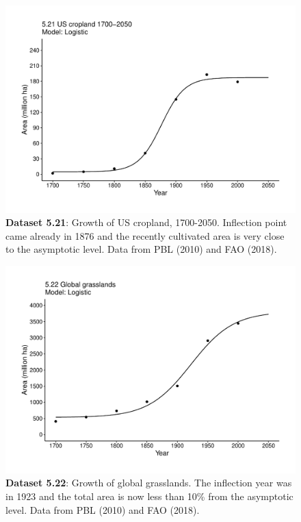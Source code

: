 \documentclass[aps,rmp,preprint,superscriptaddress,10pt,onecolumn]{article}
\begin{document}
\clearpage
\begin{figure}[h]
\includegraphics[width=\textwidth]{output/figs-ggplot/5.21.pdf}
\caption{\textbf{Dataset 5.21}: Growth of US cropland, 1700-2050. Inflection point came already in 1876 and the recently cultivated area is very close to the asymptotic level. Data from PBL (2010) and FAO (2018).}
\end{figure}
	
\clearpage
\begin{figure}[h]
\includegraphics[width=\textwidth]{output/figs-ggplot/5.22.pdf}
\caption{\textbf{Dataset 5.22}: Growth of global grasslands. The inflection year was in 1923 and the total area is now less than 10\% from the asymptotic level. Data from PBL (2010) and FAO (2018).}
\end{figure}
	
\end{document}
